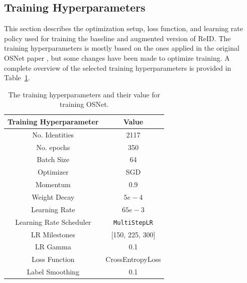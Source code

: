 \subsection{Training Hyperparameters}
This section describes the optimization setup, loss function, and learning rate policy used for training the baseline and augmented version of \acs{ReID}. The training hyperparameters is mostly based on the ones applied in the original OSNet paper \cite{OSNet}, but some changes have been made to optimize training. A complete overview of the selected training hyperparameters is provided in Table~\ref{tab:osnettrainingparameters}.
\begin{table}[H]
    \centering
    \begin{tabular}{|c|c|}\hline
         \cellcolor[HTML]{D8E9F7} \textbf{Training Hyperparameter}&  \cellcolor[HTML]{D8E9F7} \textbf{Value}\\\hline
         No. Identities &  2117\\\hline
         No. epochs &  350\\\hline
         Batch Size &  64 \\\hline
         Optimizer &  \acs{SGD} \\\hline
         Momentum&0.9\\\hline
         Weight Decay& \(5e-4\)\\\hline
 Learning Rate &\(65e-3\)\\\hline
         Learning Rate Scheduler &\texttt{MultiStepLR}\\\hline
         LR Milestones&  [150, 225, 300]\\\hline
         LR Gamma&  0.1\\\hline
         Loss Function&  CrossEntropyLoss\\\hline
         
 Label Smoothing&0.1\\ \hline
    \end{tabular}
    \caption{The training hyperparameters and their value for training OSNet.}
\label{tab:osnettrainingparameters}
\end{table}

